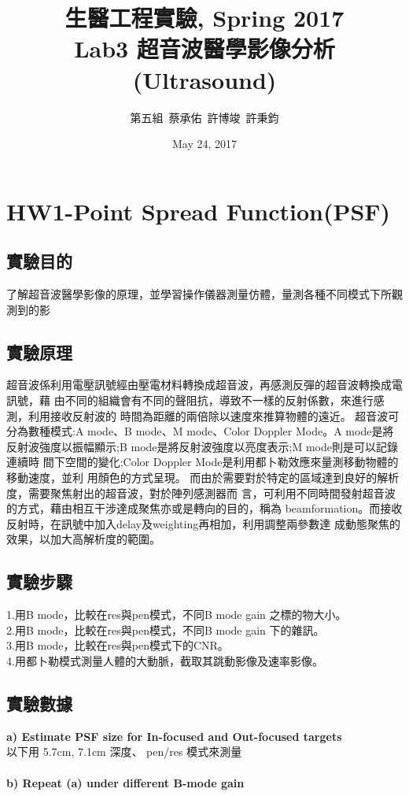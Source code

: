\documentclass[12pts,a4paper]{article}
\title{\textbf{生醫工程實驗, Spring 2017}\\ Lab3 超音波醫學影像分析(Ultrasound)}
\author{第五組\ 蔡承佑\ 許博竣\ 許秉鈞}
\date{May 24, 2017} %
\begin{document}
\maketitle
\section{HW1-Point Spread Function(PSF)}
\subsection{實驗目的}
了解超音波醫學影像的原理，並學習操作儀器測量仿體，量測各種不同模式下所觀測到的影
\subsection{實驗原理}
 超音波係利用電壓訊號經由壓電材料轉換成超音波，再感測反彈的超音波轉換成電訊號，藉 由不同的組織會有不同的聲阻抗，導致不一樣的反射係數，來進行感測，利用接收反射波的 時間為距離的兩倍除以速度來推算物體的遠近。
超音波可分為數種模式:A mode、B mode、M mode、Color Doppler Mode。A mode是將 反射波強度以振幅顯示;B mode是將反射波強度以亮度表示;M mode則是可以記錄連續時 間下空間的變化;Color Doppler Mode是利用都卜勒效應來量測移動物體的移動速度，並利 用顏色的方式呈現。 而由於需要對於特定的區域達到良好的解析度，需要聚焦射出的超音波，對於陣列感測器而 言，可利用不同時間發射超音波的方式，藉由相互干涉達成聚焦亦或是轉向的目的，稱為 beamformation。而接收反射時，在訊號中加入delay及weighting再相加，利用調整兩參數達 成動態聚焦的效果，以加大高解析度的範圍。
\subsection{實驗步驟}
1.用B mode，比較在res與pen模式，不同B mode gain 之標的物大小。\\
2.用B mode，比較在res與pen模式，不同B mode gain 下的雜訊。\\
3.用B mode，比較在res與pen模式下的CNR。\\ 4.用都卜勒模式測量人體的大動脈，截取其跳動影像及速率影像。

\subsection{實驗數據}
\textbf{a) Estimate PSF size for In-focused and Out-focused targets}  \\
以下用 5.7cm, 7.1cm 深度、 pen/res 模式來測量\\
\\
\textbf{b) Repeat (a) under different B-mode gain} \\
\end{document}

